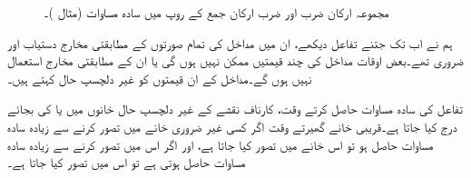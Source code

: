 \begin{figure}
\begin{subfigure}{0.45\textwidth}
\end{subfigure}
\caption{مجموعہ ارکان ضرب اور ضرب ارکان  جمع کے روپ میں سادہ مساوات (مثال )۔}
\label{شکل_بوولین_متمم_سے_حصول}
\end{figure}

 ہم نے اب تک  جتنے تفاعل دیکھے،  ان میں مداخل کی  تمام   صورتوں  کے  مطابقتی  مخارج  دستیاب  اور ضروری  تھے۔بعض اوقات   مداخل کی چند  قیمتیں  ممکن  نہیں ہوں گی   یا  ان کے مطابقتی  مخارج استعمال  نہیں  ہوں گے۔مداخل کے  ان قیمتوں کو غیر  دلچسپ   حال  کہتے ہیں۔ 

تفاعل کی سادہ مساوات حاصل کرتے وقت،   کارناف نقشے کے  غیر  دلچسپ حال  خانوں میں   یا   کی بجائے   درج کیا جاتا ہے۔قریبی خانے گھیرتے وقت اگر کسی غیر ضروری خانے  میں   تصور کرنے سے زیادہ سادہ مساوات حاصل ہو  تو اس خانے  میں   تصور کیا جاتا ہے،  اور اگر اس میں   تصور کرنے سے زیادہ سادہ مساوات حاصل ہوتی ہے تو اس میں   تصور کیا جاتا ہے۔


